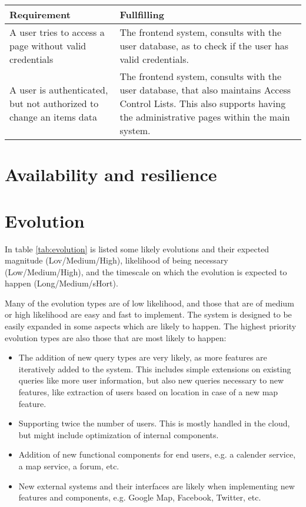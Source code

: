 \begin{table}[ht]
\centering
\begin{tabular}{p{5cm} | p{7cm}}
Requirement & Fullfilling \\ \hline
A user tries to access a page without valid credentials &
    The frontend system, consults with the user database, as to check if the
    user has valid credentials. \\ \hline
A user is authenticated, but not authorized to change an items data &
    The frontend system, consults with the user database, that also maintains
    Access Control Lists. This also supports having the administrative pages
    within the main system. \\
\end{tabular}
\end{table}

\section{Availability and resilience}
\label{sec:avail-resil}



\section{Evolution}
\label{sec:evolution}
In table \ref{tab:evolution} is listed some likely evolutions and their expected magnitude (Lov/Medium/High), likelihood of being necessary (Low/Medium/High), and the timescale on which the evolution is expected to happen (Long/Medium/sHort).

Many of the evolution types are of low likelihood, and those that are of medium or high likelihood are easy and fast to implement. The system is designed to be easily expanded in some aspects which are likely to happen. The highest priority evolution types are also those that are most likely to happen:
\begin{itemize}
\item The addition of new query types are very likely, as more features are iteratively added to the system. This includes simple extensions on existing queries like more user information, but also new queries necessary to new features, like extraction of users based on location in case of a new map feature.
\item Supporting twice the number of users. This is mostly handled in the cloud, but might include optimization of internal components.
\item Addition of new functional components for end users, e.g. a calender service, a map service, a forum, etc.
\item New external systems and their interfaces are likely when implementing new features and components, e.g. Google Map, Facebook, Twitter, etc. 
\end{itemize}

